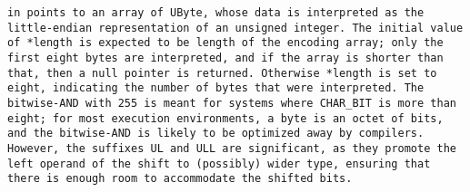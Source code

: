 \tt{in} points to an array of \tt{UByte}, whose data is interpreted
as the little-endian representation of an unsigned integer.
The initial value of \tt{*length} is expected to be length of the
encoding array; only the first eight bytes are interpreted, and if
the array is shorter than that, then a null pointer is returned.
Otherwise \tt{*length} is set to eight,
indicating the number of bytes that were interpreted.
The bitwise-AND with \tt{255} is meant for systems where \tt{CHAR_BIT} is
more than eight; for most execution environments, a byte is an octet of bits,
and the bitwise-AND is likely to be optimized away by compilers.
However, the suffixes \tt{UL} and \tt{ULL} are significant, as
they promote the left operand of the shift to (possibly) wider type,
ensuring that there is enough room to accommodate the shifted bits.
